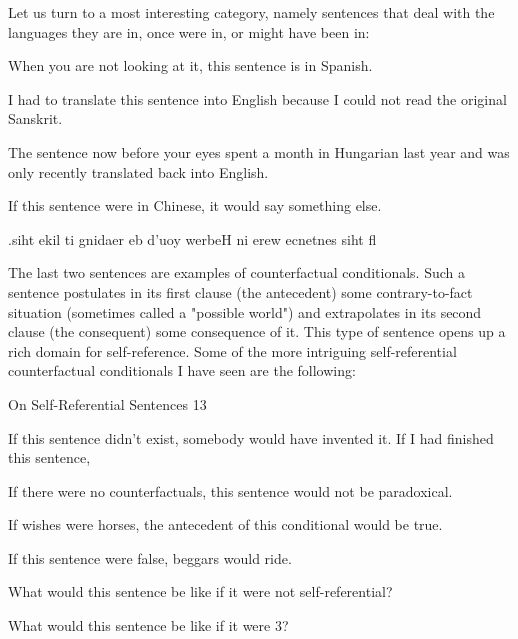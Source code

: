        Let us turn to a most interesting category, namely sentences that deal with the
languages they are in, once were in, or might have been in:

       When you are not looking at it, this sentence is in Spanish.

       I had to translate this sentence into English because I could not read the original
Sanskrit.

       The sentence now before your eyes spent a month in Hungarian last year and was
only recently translated back into English.

       If this sentence were in Chinese, it would say something else.

       .siht ekil ti gnidaer eb d'uoy werbeH ni erew ecnetnes siht fl

        The last two sentences are examples of counterfactual conditionals. Such a
sentence postulates in its first clause (the antecedent) some contrary-to-fact situation
(sometimes called a "possible world") and extrapolates in its second clause (the
consequent) some consequence of it. This type of sentence opens up a rich domain for
self-reference. Some of the more intriguing self-referential counterfactual conditionals I
have seen are the following:




On Self-Referential Sentences                                                          13

   If this sentence didn't exist, somebody would have invented it. If I had finished this
       sentence,

   If there were no counterfactuals, this sentence would not be paradoxical.

   If wishes were horses, the antecedent of this conditional would be true.

   If this sentence were false, beggars would ride.

   What would this sentence be like if it were not self-referential?

   What would this sentence be like if it were 3?

